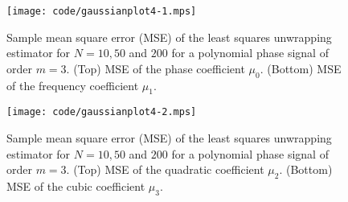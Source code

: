 \documentclass[aap]{imsart}
\begin{document}
 
\begin{figure}[p] 
   	\centering 
  		\texttt{[image: code/gaussianplot4-1.mps]}
  		\caption{Sample mean square error (MSE) of the least squares unwrapping estimator for $N=10,50$ and $200$ for a polynomial phase signal of order $m=3$. (Top) MSE of the phase coefficient $\mu_0$.  (Bottom) MSE of the frequency coefficient $\mu_1$.} 
  		\label{plot:polyest1} 
 \end{figure} 

\begin{figure}[p] 
   	\centering 
  		\texttt{[image: code/gaussianplot4-2.mps]}
  		\caption{Sample mean square error (MSE) of the least squares unwrapping estimator for $N=10,50$ and $200$ for a polynomial phase signal of order $m=3$. (Top) MSE of the quadratic coefficient $\mu_2$.  (Bottom) MSE of the cubic coefficient $\mu_3$.} 
  		\label{plot:polyest2} 
 \end{figure} 


\end{document}
